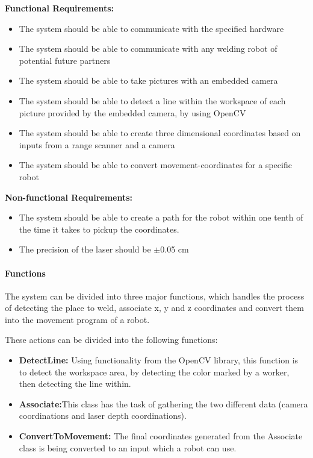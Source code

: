 \textbf{Functional Requirements:}
\begin{itemize}

\item The system should be able to communicate with the specified hardware
\item The system should be able to communicate with any welding robot of potential future partners
\item The system should be able to take pictures with an embedded camera 
\item The system should be able to detect a line within the workspace of each picture provided by the embedded camera, by using OpenCV
\item The system should be able to create three dimensional coordinates based on inputs from a range scanner and a camera
\item The system should be able to convert movement-coordinates for a specific robot

\end{itemize}

\textbf{Non-functional Requirements:}

\begin{itemize}

\item The system should be able to create a path for the robot within one tenth of the time it takes to pickup the coordinates.
\item The precision of the laser should be $\pm$0.05 cm

\end{itemize}

\paragraph*{Functions}

The system can be divided into three major functions, which handles the process of detecting the place to weld, associate x, y and z coordinates and convert them into the movement program of a robot.

These actions can be divided into the following functions:

\begin{itemize}

\item \textbf{DetectLine:} Using functionality from the OpenCV library, this function is to detect the workspace area, by detecting the color marked by a worker, then detecting the line within.
\item \textbf{Associate:}This class has the task of gathering the two different data (camera coordinations and laser depth coordinations).
\item \textbf{ConvertToMovement:} The final coordinates generated from the Associate class is being converted to an input which a robot can use. 

\end{itemize}

